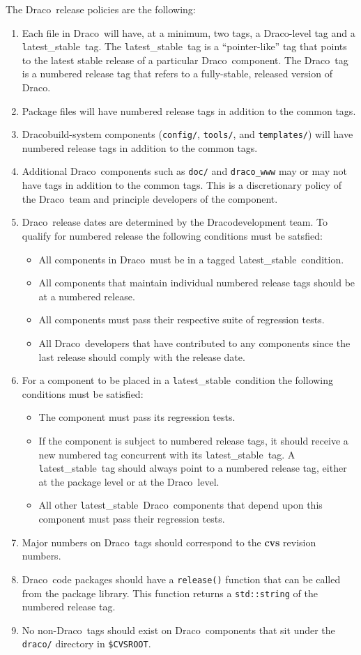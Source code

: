 \documentclass[11pt]{nmemo}
\newcommand{\draco}{{\normalfont\normalsize\textsf Draco}}
\newcommand{\stable}{{\normalfont\normalsize\texttt latest\_stable}}
\begin{document}
The \draco\ release policies are the following:
\begin{enumerate}
\item Each file in \draco\ will have, at a minimum, two tags, a
  \draco-level tag and a \stable\ tag.  The \stable\ tag is a
  ``pointer-like'' tag that points to the latest stable release of a
  particular \draco\ component.  The \draco\ tag is a numbered release 
  tag that refers to a fully-stable, released version of \draco.
\item Package files will have numbered release tags in addition to the 
  common tags.
\item \draco build-system components (\texttt{config/},
  \texttt{tools/}, and \texttt{templates/}) will have numbered release
  tags in addition to the common tags.
\item Additional \draco\ components such as \texttt{doc/} and
  \texttt{draco\_www} may or may not have tags in addition to the
  common tags.  This is a discretionary policy of the \draco\ team and 
  principle developers of the component.
\item \draco\ release dates are determined by the \draco development
  team.  To qualify for numbered release the following conditions must 
  be satsfied:
  \begin{itemize}
  \item All components in \draco\ must be in a tagged \stable\
    condition.
  \item All components that maintain individual numbered release tags
    should be at a numbered release.
  \item All components must pass their respective suite of
    regression tests.
  \item All \draco\ developers that have contributed to any
    components since the last release should comply with the release
    date.
  \end{itemize}
\item For a component to be placed in a \stable\ condition the
  following conditions must be satisfied:
  \begin{itemize}
  \item The component must pass its regression tests.
  \item If the component is subject to numbered release tags, it
    should receive a new numbered tag concurrent with its \stable\ 
    tag.  A \stable\ tag should always point to a numbered release
    tag, either at the package level or at the \draco\ level.
  \item All other \stable\ \draco\ components that depend upon this
    component must pass their regression tests.
  \end{itemize}
\item Major numbers on \draco\ tags should correspond to the {\bf cvs} 
  revision numbers.
\item \draco\ code packages should have a \texttt{release()} function
  that can be called from the package library.  This function returns
  a \texttt{std::string} of the numbered release tag.
\item No non-\draco\ tags should exist on \draco\ components that sit
  under the \texttt{draco/} directory in \texttt{\$CVSROOT}.
\end{enumerate}
\end{document}
